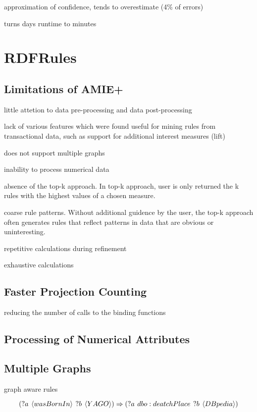 approximation of confidence, tends to overestimate (4\% of errors)

turns days runtime to minutes

\section{RDFRules}

\subsection{Limitations of AMIE+}

little attetion to data pre-processing and data post-processing

lack of various features which were found useful for mining rules from transactional data, such as support for additional interest measures (lift)

does not support multiple graphs

inability to process numerical data

absence of the top-k approach. In top-k approach, user is only returned the k rules with the highest values of a chosen measure.

coarse rule patterns. Without additional guidence by the user, the top-k approach often generates rules that reflect patterns in data that are obvious or uninteresting.

repetitive calculations during refinement

exhaustive calculations

\subsection{Faster Projection Counting}

reducing the number of calls to the binding functions


\subsection{Processing of Numerical Attributes}

\subsection{Multiple Graphs}

graph aware rules

$$(?a \hspace{0.4em} \langle wasBornIn \rangle \hspace{0.4em} ?b \hspace{0.4em} \langle YAGO \rangle) \Rightarrow (?a \hspace{0.4em} dbo:deatchPlace \hspace{0.4em} ?b \hspace{0.4em} \langle DBpedia \rangle)$$

